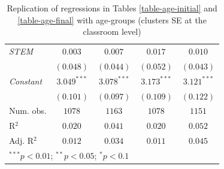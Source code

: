 \begin{table}[H]
\begin{center}
\begin{footnotesize}
\begin{tabular}{l c c c c}
\textit{STEM}         & $0.003$       & $0.007$        & $0.017$        & $0.010$        \\
                      & $(0.048)$     & $(0.044)$      & $(0.052)$      & $(0.043)$      \\
\textit{Constant}     & $3.049^{***}$ & $3.078^{***}$  & $3.173^{***}$  & $3.121^{***}$  \\
                      & $(0.101)$     & $(0.097)$      & $(0.109)$      & $(0.122)$      \\
\midrule
Num. obs.             & $1078$        & $1163$         & $1078$         & $1151$         \\
R$^2$                 & $0.020$       & $0.041$        & $0.020$        & $0.052$        \\
Adj. R$^2$            & $0.012$       & $0.034$        & $0.011$        & $0.045$        \\
\bottomrule
\multicolumn{5}{l}{\footnotesize{$^{***}p<0.01$; $^{**}p<0.05$; $^{*}p<0.1$}}
\end{tabular}
\end{footnotesize}
\caption{Replication of regressions in Tables \ref{table-age-initial} and \ref{table-age-final} with age-groups (clusters SE at the classroom level)}
\label{table-b4-noFE}
\end{center}
\end{table}

